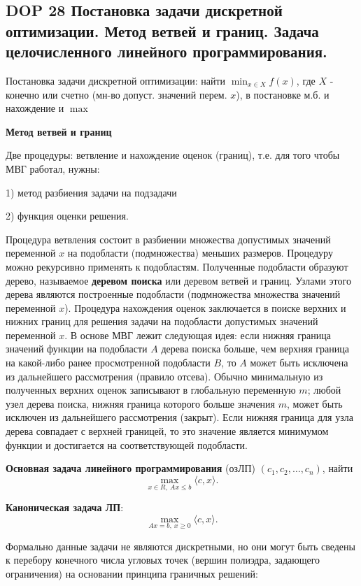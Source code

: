 \subsection{DOP 28 Постановка задачи дискретной оптимизации. Метод ветвей и границ. Задача целочисленного линейного программирования.}

Постановка задачи дискретной оптимизации: найти $\min_{x \in X} f(x)$, где $X$ - конечно или счетно (мн-во допуст. значений перем. $x$), в постановке м.б. и нахождение и $\max$

\textbf{Метод ветвей и границ}

Две процедуры: ветвление и нахождение оценок (границ), т.е. для того чтобы МВГ работал, нужны:

1) метод разбиения задачи на подзадачи

2) функция оценки решения.

Процедура ветвления состоит в разбиении множества допустимых значений переменной $x$ на подобласти (подмножества) меньших размеров.
Процедуру можно рекурсивно применять к подобластям.
Полученные подобласти образуют дерево, называемое \textbf{деревом поиска} или деревом ветвей и границ. Узлами этого дерева являются построенные подобласти (подмножества множества значений переменной $x$).
Процедура нахождения оценок заключается в поиске верхних и нижних границ для решения задачи на подобласти допустимых значений переменной $x$. В основе МВГ лежит следующая идея: если нижняя граница значений функции на подобласти $A$ дерева поиска больше, чем верхняя граница на какой-либо ранее просмотренной подобласти $B$, то $A$ может быть исключена из дальнейшего рассмотрения (правило отсева).
Обычно минимальную из полученных верхних оценок записывают в глобальную переменную $m$; любой узел дерева поиска, нижняя граница которого больше значения $m$, может быть исключен из дальнейшего рассмотрения (закрыт).
Если нижняя граница для узла дерева совпадает с верхней границей, то это значение является минимумом функции и достигается на соответствующей подобласти.

\textbf{Основная задача линейного программирования} (озЛП) $(c_1, c_2, \dots , c_n)$, найти
$$\max_{x \in R,~Ax \leqslant b} \langle c, x \rangle.$$

\textbf{Каноническая задача ЛП}:
$$\max_{Ax = b,~x \geqslant 0} \langle c, x \rangle.$$

Формально данные задачи не являются дискретными, но они могут быть сведены к перебору конечного числа угловых точек (вершин полиэдра, задающего ограничения) на основании принципа граничных решений:

